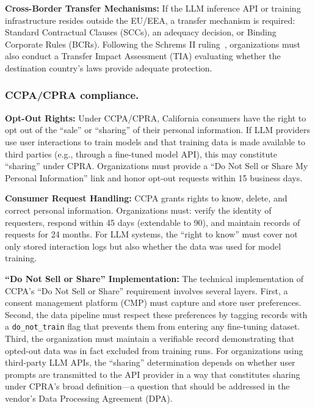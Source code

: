 \textbf{Cross-Border Transfer Mechanisms:} If the LLM inference API or training infrastructure resides outside the EU/EEA, a transfer mechanism is required: Standard Contractual Clauses (SCCs), an adequacy decision, or Binding Corporate Rules (BCRs). Following the Schrems II ruling~\cite{schremsII2020}, organizations must also conduct a Transfer Impact Assessment (TIA) evaluating whether the destination country's laws provide adequate protection.

\subsubsection{CCPA/CPRA compliance.}

\textbf{Opt-Out Rights:} Under CCPA/CPRA, California consumers have the right to opt out of the ``sale'' or ``sharing'' of their personal information. If LLM providers use user interactions to train models and that training data is made available to third parties (e.g., through a fine-tuned model API), this may constitute ``sharing'' under CPRA. Organizations must provide a ``Do Not Sell or Share My Personal Information'' link and honor opt-out requests within 15 business days.

\textbf{Consumer Request Handling:} CCPA grants rights to know, delete, and correct personal information. Organizations must: verify the identity of requesters, respond within 45 days (extendable to 90), and maintain records of requests for 24 months. For LLM systems, the ``right to know'' must cover not only stored interaction logs but also whether the data was used for model training.

\textbf{``Do Not Sell or Share'' Implementation:} The technical implementation of CCPA's ``Do Not Sell or Share'' requirement involves several layers. First, a consent management platform (CMP) must capture and store user preferences. Second, the data pipeline must respect these preferences by tagging records with a \texttt{do\_not\_train} flag that prevents them from entering any fine-tuning dataset. Third, the organization must maintain a verifiable record demonstrating that opted-out data was in fact excluded from training runs. For organizations using third-party LLM APIs, the ``sharing'' determination depends on whether user prompts are transmitted to the API provider in a way that constitutes sharing under CPRA's broad definition---a question that should be addressed in the vendor's Data Processing Agreement (DPA).

